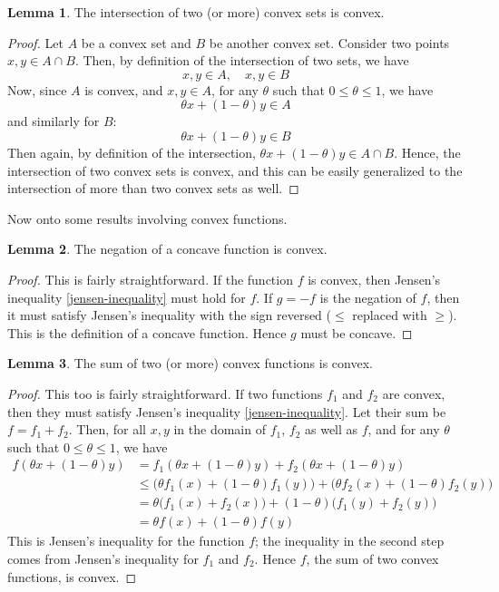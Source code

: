 \documentclass[a4paper]{article}
\theoremstyle{definition}
\newtheorem{lemma}{Lemma}[subsection]
\begin{document}
\begin{lemma}
	\label{convex-intersection}
	The intersection of two (or more) convex sets is convex.
\end{lemma}
\begin{proof}
	Let $A$ be a convex set and $B$ be another convex set.
	Consider two points $x, y \in A \cap B$.
	Then, by definition of the intersection of two sets, we have
	\begin{equation*}
		x, y \in A, \quad x, y \in B
	\end{equation*}
	Now, since $A$ is convex, and $x, y \in A$, for any $\theta$ such that $0 \leq \theta \leq 1$, we have
	\begin{equation*}
		\theta x + (1 - \theta) y \in A
	\end{equation*}
	and similarly for $B$:
	\begin{equation*}
		\theta x + (1 - \theta) y \in B
	\end{equation*}
	Then again, by definition of the intersection, $\theta x + (1 - \theta) y \in A \cap B$.
	Hence, the intersection of two convex sets is convex, and this can be easily generalized to the intersection of more than two convex sets as well.
\end{proof}

Now onto some results involving convex functions.
\begin{lemma}
	The negation of a concave function is convex.
\end{lemma}
\begin{proof}
	This is fairly straightforward.
	If the function $f$ is convex, then Jensen's inequality \eqref{jensen-inequality} must hold for $f$.
	If $g = -f$ is the negation of $f$, then it must satisfy Jensen's inequality with the sign reversed ($\leq$ replaced with $\geq$).
	This is the definition of a concave function.
	Hence $g$ must be concave.
\end{proof}

\begin{lemma}
	The sum of two (or more) convex functions is convex.
\end{lemma}
\begin{proof}
	This too is fairly straightforward.
	If two functions $f_1$ and $f_2$ are convex, then they must satisfy Jensen's inequality \eqref{jensen-inequality}.
	Let their sum be $f = f_1 + f_2$.
	Then, for all $x, y$ in the domain of $f_1$, $f_2$ as well as $f$, and for any $\theta$ such that $0 \leq \theta \leq 1$, we have
	\begin{align*}
		f(\theta x + (1 - \theta) y) & = f_1(\theta x + (1 - \theta) y) + f_2(\theta x + (1 - \theta) y) \\
		& \leq \big( \theta f_1(x) + (1 - \theta) f_1(y) \big) + \big( \theta f_2(x) + (1 - \theta) f_2(y) \big) \\
		& = \theta \big( f_1(x) + f_2(x) \big) + (1 - \theta) \big( f_1(y) + f_2(y) \big) \\
		& = \theta f(x) + (1 - \theta) f(y)
	\end{align*}
	This is Jensen's inequality for the function $f$; the inequality in the second step comes from Jensen's inequality for $f_1$ and $f_2$.
	Hence $f$, the sum of two convex functions, is convex.
\end{proof}
\end{document}
